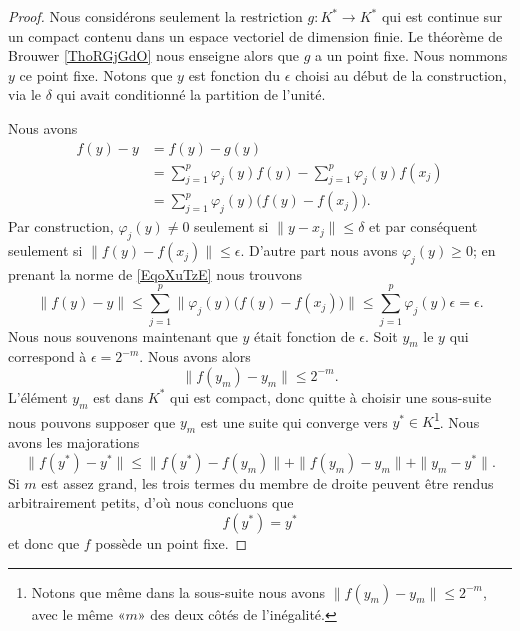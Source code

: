 \begin{proof}
	Nous considérons seulement la restriction \( g\colon K^*\to K^*\) qui est continue sur un compact contenu dans un espace vectoriel de dimension finie. Le théorème de Brouwer \ref{ThoRGjGdO} nous enseigne alors que \( g\) a un point fixe. Nous nommons \( y\) ce point fixe. Notons que \( y\) est fonction du \( \epsilon\) choisi au début de la construction, via le \( \delta\) qui avait conditionné la partition de l'unité.

	Nous avons
	\begin{subequations}        \label{EqoXuTzE}
		\begin{align}
			f(y)-y & =f(y)-g(y)                                                   \\
			       & =\sum_{j=1}^p\varphi_j(y)f(y)-\sum_{j=1}^p\varphi_j(y)f(x_j) \\
			       & =\sum_{j=1}^p\varphi_j(y)\big( f(y)-f(x_j) \big).
		\end{align}
	\end{subequations}
	Par construction, \( \varphi_j(y)\neq 0\) seulement si \( \| y-x_j \|\leq \delta\) et par conséquent seulement si \( \| f(y)-f(x_j) \|\leq \epsilon\). D'autre part nous avons \( \varphi_j(y)\geq 0\); en prenant la norme de \eqref{EqoXuTzE} nous trouvons
	\begin{equation}
		\| f(y)-y \|\leq \sum_{j=1}^p\| \varphi_j(y)\big( f(y)-f(x_j) \big) \|\leq \sum_{j=1}^p\varphi_j(y)\epsilon=\epsilon.
	\end{equation}
	Nous nous souvenons maintenant que \( y\) était fonction de \( \epsilon\). Soit \( y_m\) le \( y\) qui correspond à \( \epsilon=2^{-m}\). Nous avons alors
	\begin{equation}
		\| f(y_m)-y_m \|\leq 2^{-m}.
	\end{equation}
	L'élément \( y_m\) est dans \( K^*\) qui est compact, donc quitte à choisir une sous-suite nous pouvons supposer que \( y_m\) est une suite qui converge vers \( y^*\in K\)\footnote{Notons que même dans la sous-suite nous avons \( \| f(y_m)-y_m \|\leq 2^{-m}\), avec le même «\( m\)» des deux côtés de l'inégalité.}. Nous avons les majorations
	\begin{equation}
		\| f(y^*)-y^* \|\leq \| f(y^*)-f(y_m) \|+\| f(y_m)-y_m \|+\| y_m-y^* \|.
	\end{equation}
	Si \( m\) est assez grand, les trois termes du membre de droite peuvent être rendus arbitrairement petits, d'où nous concluons que
	\begin{equation}
		f(y^*)=y^*
	\end{equation}
	et donc que \( f\) possède un point fixe.
\end{proof}

